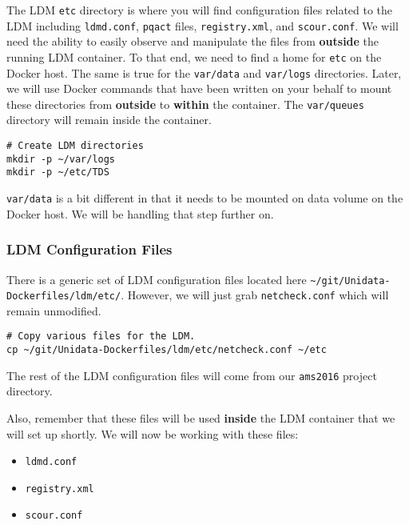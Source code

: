 \documentclass[11pt]{article}
\begin{document}
The LDM \texttt{etc} directory is where you will find configuration files related to the LDM including \texttt{ldmd.conf}, \texttt{pqact} files, \texttt{registry.xml}, and  \texttt{scour.conf}. We will need the ability to easily observe and manipulate the files from \textbf{outside} the running LDM container. To that end, we need to find a home for \texttt{etc} on the Docker host. The same is true for the \texttt{var/data} and \texttt{var/logs} directories. Later, we will use Docker commands that have been written on your behalf to mount these directories from \textbf{outside} to \textbf{within} the container. The \texttt{var/queues} directory will remain inside the container.

\begin{verbatim}
# Create LDM directories
mkdir -p ~/var/logs 
mkdir -p ~/etc/TDS
\end{verbatim}

\texttt{var/data} is a bit different in that it needs to be mounted on data volume on the Docker host. We will be handling that step further on.

\subsubsection{LDM Configuration Files}
\label{sec:orgheadline22}

There is a generic set of LDM configuration files located here \texttt{\textasciitilde{}/git/Unidata-Dockerfiles/ldm/etc/}. However, we will just grab \texttt{netcheck.conf} which will remain unmodified.

\begin{verbatim}
# Copy various files for the LDM.
cp ~/git/Unidata-Dockerfiles/ldm/etc/netcheck.conf ~/etc
\end{verbatim}

The rest of the LDM configuration files will come from our \texttt{ams2016} project directory.

Also, remember that these files will be used \textbf{inside} the LDM container that we will set up shortly. We will now be working with these files:

\begin{itemize}
\item \texttt{ldmd.conf}
\item \texttt{registry.xml}
\item \texttt{scour.conf}
\end{itemize}
\end{document}
